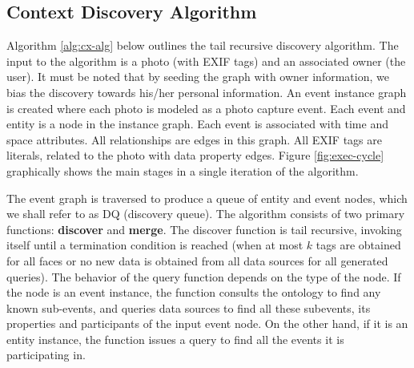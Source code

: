 \subsection{Context Discovery Algorithm}
\label{sec:discovery-algorithm}
Algorithm \ref{alg:cx-alg} below outlines the tail recursive discovery algorithm. The input to the algorithm is a photo (with EXIF tags) and an associated owner (the user). It must be noted that by seeding the graph with owner information, we bias the discovery towards his/her personal information. An event instance graph is created where each photo is modeled as a photo capture event. Each event and entity is a node in the instance graph. Each event is associated with time and space attributes. All relationships are edges in this graph. All EXIF tags are literals, related to the photo with data property edges. Figure \ref{fig:exec-cycle} graphically shows the main stages in a single iteration of the algorithm.

The event graph is traversed to produce a queue of entity and event nodes, which we shall refer to as DQ (discovery queue). The algorithm consists of two primary functions: \textbf{discover} and \textbf{merge}. The discover function is tail recursive, invoking itself until a termination condition is reached (when at most $k$ tags are obtained for all faces or no new data is obtained from all data sources for all generated queries). The behavior of the query function depends on the type of the node. If the node is an event instance, the function consults the ontology to find any known sub-events, and queries data sources to find all these subevents, its properties and participants of the input event node. On the other hand, if it is an entity instance, the function issues a query to find all the events it is participating in. 

